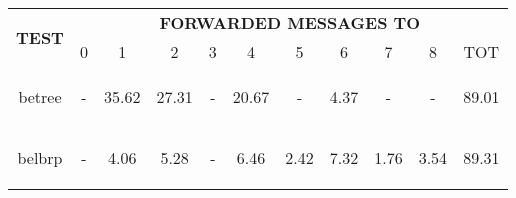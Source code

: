 \documentclass{article}
\begin{document}
		\begin{table}[H]
			\begin{center}
			    \begin{tabular}{|c|c|c|c|c|c|c|c|c|c|c|}
				    \hline
				    \multirow{2}{*}{\textbf{TEST}} & \multicolumn{10}{c|}{\textbf{FORWARDED MESSAGES TO}} \\ \cline{2-11}
					& 0 & 1 & 2 & 3 & 4 & 5& 6 & 7 & 8 & TOT \\ \hline
				    betree & \begin{footnotesize}-\end{footnotesize} & \begin{footnotesize}35.62\end{footnotesize} & \begin{footnotesize}27.31\end{footnotesize} & \begin{footnotesize}-\end{footnotesize} & \begin{footnotesize}20.67\end{footnotesize} & \begin{footnotesize}-\end{footnotesize} & \begin{footnotesize}4.37\end{footnotesize} & \begin{footnotesize}-\end{footnotesize} & \begin{footnotesize}-\end{footnotesize} & \begin{footnotesize}89.01\end{footnotesize} \\ \hline
				    belbrp & \begin{footnotesize}-\end{footnotesize} & \begin{footnotesize}4.06\end{footnotesize} & \begin{footnotesize}5.28\end{footnotesize} & \begin{footnotesize}-\end{footnotesize} & \begin{footnotesize}6.46\end{footnotesize} & \begin{footnotesize}2.42\end{footnotesize} & \begin{footnotesize}7.32\end{footnotesize} & \begin{footnotesize}1.76\end{footnotesize} & \begin{footnotesize}3.54\end{footnotesize} & \begin{footnotesize}89.31\end{footnotesize}\\ \hline

\end{tabular}
\end{center}
\end{table}
\end{document}
